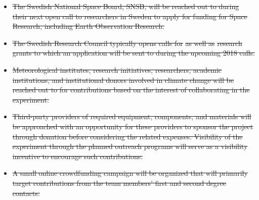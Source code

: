 \documentclass[a4paper,12pt,twoside]{article}
\providecommand{\DIFdeltex}[1]{{\protect\color{red}\sout{#1}}}                      %
\providecommand{\DIFdel}[1]{\texorpdfstring{\DIFdeltex{#1}}{}} %
\begin{document}
\begin{itemize}%
\item%
\DIFdel{The Swedish National Space Board, SNSB, will be reached out to during their next open call to researchers in Sweden to apply for funding for Space Research, including Earth Observation Research. }%
\item%
\DIFdel{The Swedish Research Council typically opens calls for }%
\DIFdel{as well as }%
\DIFdel{research grants to which an application will be sent to during the upcoming 2018 calls. }%
\item%
\DIFdel{Meteorological institutes, research initiatives, researchers, academic institutions, and institutional donors involved in climate change will be reached out to for contributions based on the interest of collaborating in the experiment. }%
\item%
\DIFdel{Third-party providers of required equipment, components, and materials will be approached with an opportunity for these providers to sponsor the project through donation before considering the related expenses. 
Visibility of the experiment through the planned outreach programs will serve as a visibility incentive to encourage such contributions.
    }%
\item%
\DIFdel{A small online crowdfunding campaign will be organized that will primarily target contributions from the team members' first and second degree contacts.
}
\end{itemize}%
\end{document}
